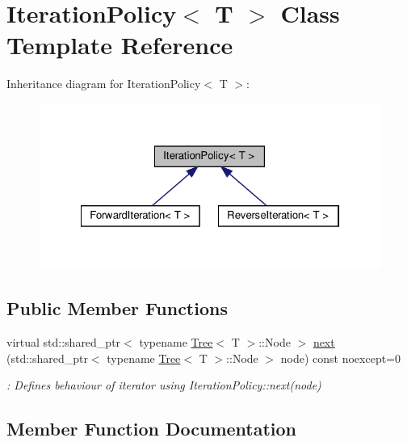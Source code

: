 \hypertarget{classIterationPolicy}{}\section{Iteration\+Policy$<$ T $>$ Class Template Reference}
\label{classIterationPolicy}


Inheritance diagram for Iteration\+Policy$<$ T $>$\+:
\nopagebreak
\begin{figure}[H]
\begin{center}
\leavevmode
\includegraphics[width=322pt]{classIterationPolicy__inherit__graph}
\end{center}
\end{figure}
\subsection*{Public Member Functions}
\begin{DoxyCompactItemize}
\item 
virtual std\+::shared\+\_\+ptr$<$ typename \hyperlink{classTree}{Tree}$<$ T $>$\+::Node $>$ \hyperlink{classIterationPolicy_a69a898482a3a2ec09fd6efec002bace8}{next} (std\+::shared\+\_\+ptr$<$ typename \hyperlink{classTree}{Tree}$<$ T $>$\+::Node $>$ node) const noexcept=0
\begin{DoxyCompactList}\small\item\em \+: Defines behaviour of iterator using Iteration\+Policy\+::next(node) \end{DoxyCompactList}\end{DoxyCompactItemize}


\subsection{Member Function Documentation}
\mbox{\label{classIterationPolicy_a69a898482a3a2ec09fd6efec002bace8}} 
